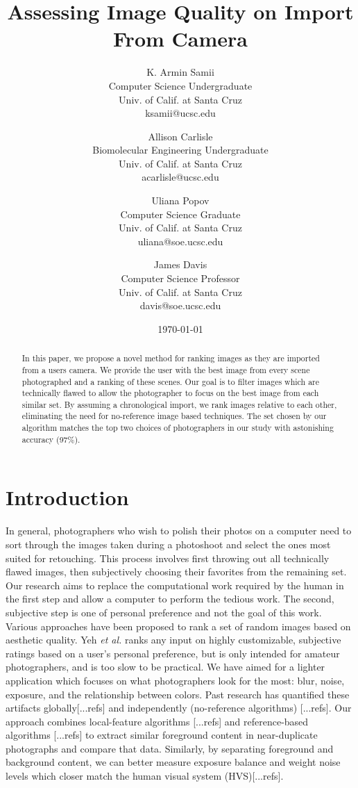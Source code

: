 \documentclass[twocolumn]{article}
\title{
   Assessing Image Quality on Import From Camera
} %
\author{
   K. Armin Samii\\
   Computer Science Undergraduate\\
   Univ. of Calif. at Santa Cruz\\
   ksamii@ucsc.edu
  \and
   Allison Carlisle\\
   Biomolecular Engineering Undergraduate\\
   Univ. of Calif. at Santa Cruz\\
   acarlisle@ucsc.edu
  \and
   Uliana Popov\\
   Computer Science Graduate\\
   Univ. of Calif. at Santa Cruz\\
   uliana@soe.ucsc.edu
  \and
   James Davis\\
   Computer Science Professor\\
   Univ. of Calif. at Santa Cruz\\
   davis@soe.ucsc.edu
}
\date{\today}
\begin{document}
\maketitle

\begin{abstract}
In this paper, we propose a novel method for ranking images as they are imported from a users camera. We provide the user with the best image from every scene photographed and a ranking of these scenes. Our goal is to filter images which are technically flawed to allow the photographer to focus on the best image from each similar set. By assuming a chronological import, we rank images relative to each other, eliminating the need for no-reference image based techniques. The set chosen by our algorithm matches the top two choices of photographers in our study with astonishing accuracy (97\%).
\end{abstract}
\section{Introduction}
In general, photographers who wish to polish their photos on a computer need to sort through the images taken during a photoshoot and select the ones most suited for retouching. This process involves first throwing out all technically flawed images, then subjectively choosing their favorites from the remaining set.
Our research aims to replace the computational work required by the human in the first step and allow a computer to perform the tedious work. The second, subjective step is one of personal preference and not the goal of this work.
Various approaches have been proposed to rank a set of random images based on aesthetic quality. Yeh \textit{et al.}\cite{Yeh:2010:PPR:1873951.1873963} ranks any input on highly customizable, subjective ratings based on a user's personal preference, but is only intended for amateur photographers, and is too slow to be practical. We have aimed for a lighter application which focuses on what photographers look for the most: blur, noise, exposure, and the relationship between colors.
Past research has quantified these artifacts globally[...refs] and independently (no-reference algorithms) [...refs]. Our approach combines local-feature algorithms [...refs] and reference-based algorithms [...refs] to extract similar foreground content in near-duplicate photographs and compare that data. Similarly, by separating foreground and background content, we can better measure exposure balance and weight noise levels which closer match the human visual system (HVS)[...refs].
\end{document}
